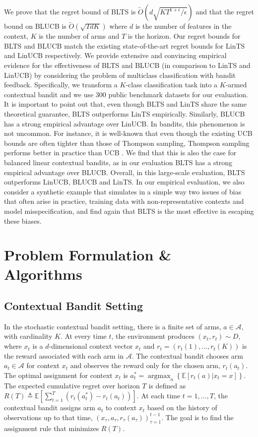 \documentclass[letterpaper]{article} %
\def\A{\mathcal{A}}
\def\E{\mathbb{E}}
\DeclareMathOperator*{\argmax}{argmax}
\begin{document}
We prove that the regret bound of BLTS is $\tilde{O}\left(d\sqrt{K T^{1+\epsilon} / \epsilon}\right)$ and that the regret bound on BLUCB is $\tilde{O}\left(\sqrt{TdK}\right)$
where $d$ is the number of features in the context, $K$ is the number of arms and $T$ is the horizon.
Our regret bounds for BLTS and BLUCB match the existing state-of-the-art regret bounds for LinTS \cite{agrawal-lints} and LinUCB \cite{chu2011contextual} respectively.
We provide extensive and convincing empirical evidence for the effectiveness of BLTS and BLUCB (in comparison to LinTS and LinUCB) by considering the problem of multiclass classification with bandit feedback.
Specifically, we transform a $K$-class classification task into a $K$-armed contextual bandit \cite{dudik-offline-1} and we use 300 public benchmark datasets for our evaluation.
It is important to point out that, even though BLTS and LinTS share the same theoretical guarantee, BLTS outperforms LinTS empirically. Similarly, BLUCB has a strong empirical advantage over LinUCB.
In bandits, this phenomenon is not uncommon. For instance, it is well-known that even though the existing UCB bounds are often tighter than those of Thompson sampling, Thompson sampling performs better in practice than UCB \cite{chapelle-tsucb}.
We find that this is also the case for balanced linear contextual bandits, as in our evaluation BLTS has a strong empirical advantage over BLUCB.
Overall, in this large-scale evaluation, BLTS outperforms LinUCB, BLUCB and LinTS.
In our empirical evaluation, we also consider a synthetic example  that simulates in a simple way two issues of bias that often arise in practice, training data with non-representative contexts and model misspecification, and find again that BLTS is the most effective in escaping these biases.


\section{Problem Formulation \& Algorithms} \label{designs}

\subsection{Contextual Bandit Setting}
In the stochastic contextual bandit setting, there is a finite set of arms, $a \in \A$, with cardinality $K$.
At every time $t$, the environment produces $(x_t, r_t) \sim D$, where $x_t$ is a $d$-dimensional context vector $x_t$ and $r_t = \left(r_t(1), \dots, r_t(K)\right)$ is the reward associated with each arm in $\A$.
The contextual bandit chooses arm $a_t \in \A$ for context $x_t$ and observes the reward only for the chosen arm, $r_t(a_t)$.
The optimal assignment for context $x_t$ is $a_t^* = \argmax_a\left\{\E[r_t(a) | x_t=x]\right\}$.
The expected cumulative regret over horizon $T$ is defined as $R(T) \triangleq \E\left[\sum_{t=1}^{T}\left(r_t(a^*_t) - r_t(a_t)\right)\right]$.
At each time $t = 1, \dots, T$, the contextual bandit assigns arm $a_t$ to context $x_t$ based on the history of observations up to that time, $(x_\tau, a_\tau, r_\tau(a_\tau))_{\tau=1}^{t-1}$.
The goal is to find the assignment rule that minimizes $R(T)$.
\end{document}
